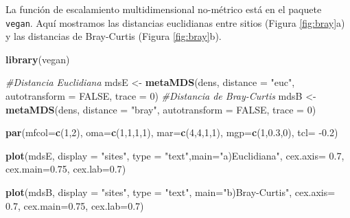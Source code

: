 \documentclass[]{book}
\newenvironment{Shaded}{\begin{snugshade}}{\end{snugshade}}
\newcommand{\KeywordTok}[1]{\textcolor[rgb]{0.13,0.29,0.53}{\textbf{{#1}}}}
\newcommand{\DataTypeTok}[1]{\textcolor[rgb]{0.13,0.29,0.53}{{#1}}}
\newcommand{\DecValTok}[1]{\textcolor[rgb]{0.00,0.00,0.81}{{#1}}}
\newcommand{\FloatTok}[1]{\textcolor[rgb]{0.00,0.00,0.81}{{#1}}}
\newcommand{\StringTok}[1]{\textcolor[rgb]{0.31,0.60,0.02}{{#1}}}
\newcommand{\CommentTok}[1]{\textcolor[rgb]{0.56,0.35,0.01}{\textit{{#1}}}}
\newcommand{\OtherTok}[1]{\textcolor[rgb]{0.56,0.35,0.01}{{#1}}}
\newcommand{\NormalTok}[1]{{#1}}
\begin{document}
La función de escalamiento multidimensional no-métrico está en el
paquete \texttt{vegan}. Aquí mostramos las distancias euclidianas entre
sitios (Figura \ref{fig:bray}a) y las distancias de Bray-Curtis (Figura
\ref{fig:bray}b).

\begin{Shaded}
\begin{Highlighting}[]
\KeywordTok{library}\NormalTok{(vegan) }

\CommentTok{#Distancia Euclidiana}
\NormalTok{mdsE <-}\StringTok{ }\KeywordTok{metaMDS}\NormalTok{(dens, }\DataTypeTok{distance =} \StringTok{"euc"}\NormalTok{, }\DataTypeTok{autotransform =} \OtherTok{FALSE}\NormalTok{, }\DataTypeTok{trace =} \DecValTok{0}\NormalTok{) }
\CommentTok{#Distancia de Bray-Curtis}
\NormalTok{mdsB <-}\StringTok{ }\KeywordTok{metaMDS}\NormalTok{(dens, }\DataTypeTok{distance =} \StringTok{"bray"}\NormalTok{, }\DataTypeTok{autotransform =} \OtherTok{FALSE}\NormalTok{, }\DataTypeTok{trace =} \DecValTok{0}\NormalTok{) }
\end{Highlighting}
\end{Shaded}

\begin{Shaded}
\begin{Highlighting}[]
\KeywordTok{par}\NormalTok{(}\DataTypeTok{mfcol=}\KeywordTok{c}\NormalTok{(}\DecValTok{1}\NormalTok{,}\DecValTok{2}\NormalTok{), }\DataTypeTok{oma=}\KeywordTok{c}\NormalTok{(}\DecValTok{1}\NormalTok{,}\DecValTok{1}\NormalTok{,}\DecValTok{1}\NormalTok{,}\DecValTok{1}\NormalTok{), }\DataTypeTok{mar=}\KeywordTok{c}\NormalTok{(}\DecValTok{4}\NormalTok{,}\DecValTok{4}\NormalTok{,}\DecValTok{1}\NormalTok{,}\DecValTok{1}\NormalTok{),}
    \DataTypeTok{mgp=}\KeywordTok{c}\NormalTok{(}\DecValTok{1}\NormalTok{,}\FloatTok{0.3}\NormalTok{,}\DecValTok{0}\NormalTok{), }\DataTypeTok{tcl=} \NormalTok{-}\FloatTok{0.2}\NormalTok{)}

\KeywordTok{plot}\NormalTok{(mdsE, }\DataTypeTok{display =} \StringTok{"sites"}\NormalTok{, }
     \DataTypeTok{type =} \StringTok{"text"}\NormalTok{,}\DataTypeTok{main=}\StringTok{"a)Euclidiana"}\NormalTok{, }
     \DataTypeTok{cex.axis=} \FloatTok{0.7}\NormalTok{, }\DataTypeTok{cex.main=}\FloatTok{0.75}\NormalTok{, }\DataTypeTok{cex.lab=}\FloatTok{0.7}\NormalTok{)}

\KeywordTok{plot}\NormalTok{(mdsB, }\DataTypeTok{display =} \StringTok{"sites"}\NormalTok{, }\DataTypeTok{type =} \StringTok{"text"}\NormalTok{, }
     \DataTypeTok{main=}\StringTok{"b)Bray-Curtis"}\NormalTok{, }
     \DataTypeTok{cex.axis=} \FloatTok{0.7}\NormalTok{, }\DataTypeTok{cex.main=}\FloatTok{0.75}\NormalTok{, }\DataTypeTok{cex.lab=}\FloatTok{0.7}\NormalTok{)}
\end{Highlighting}
\end{Shaded}
\end{document}
